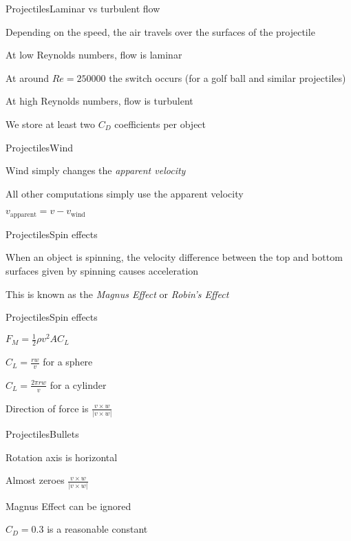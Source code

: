\documentclass{beamer}
\begin{document}

\begin{slide}{Projectiles}{Laminar vs turbulent flow}{
\item Depending on the speed, the air travels over the surfaces of the projectile
\item At low Reynolds numbers, flow is laminar
\item At around $Re = 250000$ the switch occurs (for a golf ball and similar projectiles)
\item At high Reynolds numbers, flow is turbulent
\item We store at least two $C_D$ coefficients per object
}\end{slide}

\begin{slide}{Projectiles}{Wind}{
\item Wind simply changes the \textit{apparent velocity}
\item All other computations simply use the apparent velocity
\item $v_{\text{apparent}} = v - v_{\text{wind}}$
}\end{slide}

\begin{slide}{Projectiles}{Spin effects}{
\item When an object is spinning, the velocity difference between the top and bottom surfaces given by spinning causes acceleration
\item This is known as the \textit{Magnus Effect} or \textit{Robin's Effect}
}\end{slide}


\begin{slide}{Projectiles}{Spin effects}{
\item $F_M = \frac{1}{2} \rho v^2 A C_L$
\item $C_L = \frac{r w}{v}$ for a sphere
\item $C_L = \frac{2 \pi r w}{v}$ for a cylinder
\item Direction of force is $\frac{v \times w}{|v \times w|}$
}\end{slide}

\begin{slide}{Projectiles}{Bullets}{
\item Rotation axis is horizontal
\item Almost zeroes $\frac{v \times w}{|v \times w|}$
\item Magnus Effect can be ignored
\item $C_D = 0.3$ is a reasonable constant
}\end{slide}
\end{document}
